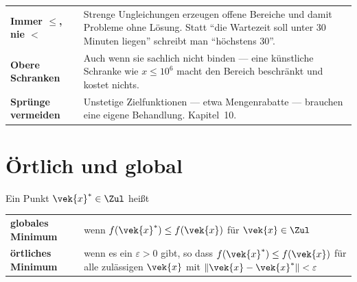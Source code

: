 \begin{merksatz}
\begin{center}
{\small
\renewcommand{\arraystretch}{1.5}
\begin{tabular}{@{}P{2.6cm}P{6.0cm}@{}}
\toprule
\textbf{Immer $\le$, nie $<$} & Strenge Ungleichungen erzeugen offene Bereiche und damit Probleme ohne Lösung. Statt \enquote{die Wartezeit soll unter $30$ Minuten liegen} schreibt man \enquote{höchstens $30$}.\\
\textbf{Obere Schranken} & Auch wenn sie sachlich nicht binden --- eine künstliche Schranke wie $x \le 10^6$ macht den Bereich beschränkt und kostet nichts.\\
\textbf{Sprünge vermeiden} & Unstetige Zielfunktionen --- etwa Mengenrabatte --- brauchen eine eigene Behandlung. Kapitel~10.\\
\bottomrule
\end{tabular}}
\end{center}

\begin{center}
\begin{minipage}{0.88\textwidth}
\end{minipage}
\end{center}
\end{merksatz}

\section{Örtlich und global}

\begin{definition}
Ein Punkt $\vek{x}^{*} \in \Zul$ heißt
\begin{center}
{\small
\renewcommand{\arraystretch}{1.55}
\begin{tabular}{@{}P{2.8cm}P{5.8cm}@{}}
\toprule
\textbf{globales Minimum} & wenn $f(\vek{x}^{*}) \le f(\vek{x})$ für  $\vek{x} \in \Zul$\\
\textbf{örtliches Minimum} & wenn es ein $\varepsilon > 0$ gibt, so dass $f(\vek{x}^{*}) \le f(\vek{x})$ für alle zulässigen $\vek{x}$ mit $\|\vek{x}-\vek{x}^{*}\| < \varepsilon$\\
\bottomrule
\end{tabular}}
\end{center}
\end{definition}

